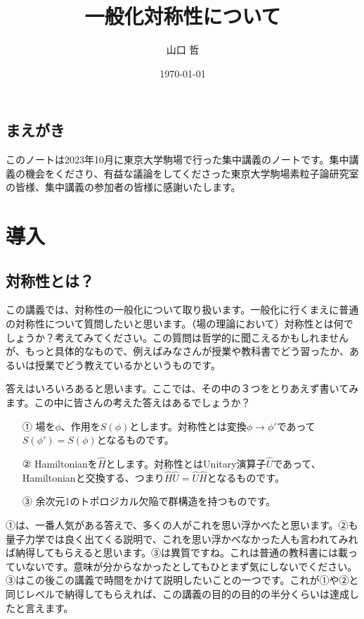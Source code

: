 \documentclass[report,paper=a4, fontsize=12pt, line_length=16cm, number_of_lines=33,dvipdfmx]{jlreq}
\title{一般化対称性について}
\author{山口 哲}
\date{\today}
\newcommand{\preface}[1]{\section*{#1}}
\numberwithin{equation}{chapter}
\newcommand{\Hh}{\widehat{H}}
\newcommand{\Uh}{\widehat{U}}
\begin{document}
\maketitle
\tableofcontents

\preface{まえがき}

このノートは2023年10月に東京大学駒場で行った集中講義のノートです。集中講義の機会をくださり、有益な議論をしてくださった東京大学駒場素粒子論研究室の皆様、集中講義の参加者の皆様に感謝いたします。

\chapter{導入}
\section{対称性とは？}

この講義では、対称性の一般化について取り扱います。一般化に行くまえに普通の対称性について質問したいと思います。（場の理論において）対称性とは何でしょうか？考えてみてください。この質問は哲学的に聞こえるかもしれませんが、もっと具体的なもので、例えばみなさんが授業や教科書でどう習ったか、あるいは授業でどう教えているかというものです。

答えはいろいろあると思います。ここでは、その中の３つをとりあえず書いてみます。この中に皆さんの考えた答えはあるでしょうか？
\begin{itemize}
  \item[①] 場を$\phi$、作用を$S(\phi)$とします。対称性とは変換$\phi\to\phi'$であって$S(\phi')=S(\phi)$となるものです。
  \item[②] Hamiltonianを$\Hh$とします。対称性とはUnitary演算子$\Uh$であって、Hamiltonianと交換する、つまり$\Hh \Uh =\Uh \Hh$となるものです。
  \item[③] 余次元1のトポロジカル欠陥で群構造を持つものです。  
\end{itemize}
①は、一番人気がある答えで、多くの人がこれを思い浮かべたと思います。②も量子力学では良く出てくる説明で、これを思い浮かべなかった人も言われてみれば納得してもらえると思います。③は異質ですね。これは普通の教科書には載っていないです。意味が分からなかったとしてもひとまず気にしないでください。③はこの後この講義で時間をかけて説明したいことの一つです。これが①や②と同じレベルで納得してもらえれば、この講義の目的の目的の半分くらいは達成したと言えます。
\end{document}

